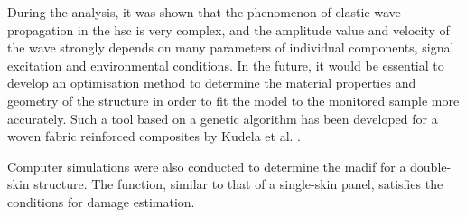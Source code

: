 During the analysis, it was shown that the phenomenon of elastic wave propagation in the \ac{hsc} is very complex, and the amplitude value and velocity of the wave strongly depends on many parameters of individual components, signal excitation and environmental conditions.
In the future, it would be essential to develop an optimisation method to determine the material properties and geometry of the structure in order to fit the model to the monitored sample more accurately.
Such a tool based on a genetic algorithm has been developed for a woven fabric reinforced composites by Kudela et al. \cite{kudela2020elastic}.

Computer simulations were also conducted to determine the \ac{madif} for a double-skin structure.
The function, similar to that of a single-skin panel, satisfies the conditions for damage estimation.